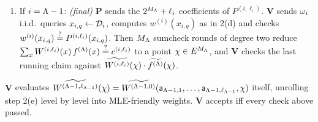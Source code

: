 \begin{protocol}
\begin{enumerate}[itemsep=0.5pt,topsep=2pt]
\begin{enumerate}[itemsep=0.5pt,topsep=1pt,label=(\alph*)]
\item \emph{(commit)} $\mathbf{P}$ sends the oracle $\orc^{(i+1)}[u, \cdot] := \Enc_{i+1}(f^{(i+1)}(u, \cdot))$, $u \in \cube{\ell_{i+1}}$, row $u$ evaluating the new lane $P^{(i+1,0)}_u:=\mpoly_{f^{(i+1)}(u,\cdot)}$, then sends $\phigh^{(i)}$.
\item \emph{(ood)} $\mathbf{V}$ sends $z_{i+1} \leftarrow \E^{\nv_{i+1}}$; $\mathbf{P}$ sends $\cood{i+1} \in \E$ (honestly $\mle{f^{(i+1)}}(z_{i+1})$).
\item \emph{(query)} $\mathbf{V}$ sends $\nq_i$ i.i.d.\ query points $(x_{i,q})_{q<\nq_i} \leftarrow (\dom_i)^{\nq_i}$, and $\lambda_{i+1}\leftarrow\E$.
\item \emph{(read)} $\mathbf{V}$ reads the columns $\orc^{(i)}[\cdot, x_{i,q}]$, folds each to $w^{(i)}(x_{i,q})$, and removes the high part, $c_{i,q} := w^{(i)}(x_{i,q}) + \Wn{\kappa_i}(x_{i,q})\sum_{s<\ell_i}\phigh^{(i)}_s\,\novel_s(x_{i,q})$ (honestly $\Enc_i(f^{(i+1)})[x_{i,q}]$).
\item \emph{(next level)} The $J_{i+1}:=\nq_i+2$ claims of level $i+1$ (the residual, OOD and consistency claims), are batched into one running claim about the new lanes:
\[
\begin{gathered}
W^{(i+1,0)} := W^{(i,\ell_i)} + \lambda_{i+1}\,\eq(z_{i+1},\cdot) + \lambda_{i+1}^2\textstyle\sum_q \lambda_{i+1}^{q} W_{i,x_{i,q}},\\
\rc{i+1,0} := \rc{i,\ell_i} + \lambda_{i+1}\,\cood{i+1} + \lambda_{i+1}^2\textstyle\sum_{q}\lambda_{i+1}^{q}c_{i,q},
\end{gathered}
\]
where $W_{i,x}$ are the column weights of $\Enc_i$ (\S\ref{sec:codes}).
\end{enumerate}
\item If $i = \Lambda - 1$: \emph{(final)} $\mathbf{P}$ sends the $2^{M_\Lambda}+\ell_i$ coefficients of $P^{(i,\ell_i)}$. $\mathbf{V}$ sends $\nq_i$ i.i.d.\ queries $x_{i,q} \leftarrow \mathcal{D}_i$, computes $w^{(i)}(x_{i,q})$ as in 2(d) and checks $w^{(i)}(x_{i,q})\stackrel{?}{=} P^{(i,\ell_i)}(x_{i,q})$. Then $M_\Lambda$ sumcheck rounds of degree two reduce $\sum_x W^{(i,\ell_i)}(x)\,f^{(\Lambda)}(x)\stackrel{?}{=}c^{(i,\ell_i)}$ to a point $\chi\in E^{M_\Lambda}$, and $\mathbf{V}$ checks the last running claim against $\widetilde{W^{(i,\ell_i)}}(\chi)\cdot\widetilde{f^{(\Lambda)}}(\chi)$.
\end{enumerate}
$\mathbf{V}$ evaluates $\widetilde{W^{(\Lambda-1,\ell_{\Lambda-1})}}(\chi)=\widetilde{W^{(\Lambda-1,0)}}(\mathsf{a}_{\Lambda-1,1},\dots,\mathsf{a}_{\Lambda-1,\ell_{\Lambda-1}},\chi)$ itself, unrolling step 2(e) level by level into MLE-friendly weights. $\mathbf{V}$ accepts iff every check above passed.
\end{protocol}

